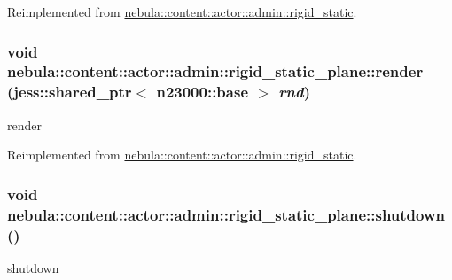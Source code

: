 Reimplemented from \hyperlink{classnebula_1_1content_1_1actor_1_1admin_1_1rigid__static_a12aee11a228e35bd7a8b36ff411387a8}{nebula::content::actor::admin::rigid\_\-static}.\hypertarget{classnebula_1_1content_1_1actor_1_1admin_1_1rigid__static__plane_ac4b170a8bd046d8a9b8822cfd9ce89e5}{
\subsubsection[{render}]{\setlength{\rightskip}{0pt plus 5cm}void nebula::content::actor::admin::rigid\_\-static\_\-plane::render (jess::shared\_\-ptr$<$ {\bf n23000::base} $>$ {\em rnd})}}
\label{classnebula_1_1content_1_1actor_1_1admin_1_1rigid__static__plane_ac4b170a8bd046d8a9b8822cfd9ce89e5}


render 

Reimplemented from \hyperlink{classnebula_1_1content_1_1actor_1_1admin_1_1rigid__static_a574621febd60cbfd2949c00430d7f5f3}{nebula::content::actor::admin::rigid\_\-static}.\hypertarget{classnebula_1_1content_1_1actor_1_1admin_1_1rigid__static__plane_a40139ed218560b51d64612559be0564d}{
\subsubsection[{shutdown}]{\setlength{\rightskip}{0pt plus 5cm}void nebula::content::actor::admin::rigid\_\-static\_\-plane::shutdown ()}}
\label{classnebula_1_1content_1_1actor_1_1admin_1_1rigid__static__plane_a40139ed218560b51d64612559be0564d}


shutdown 

